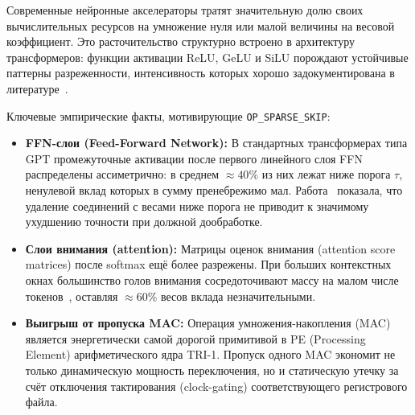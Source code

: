 
Современные нейронные акселераторы тратят значительную долю своих
вычислительных ресурсов на умножение нуля или малой величины на
весовой коэффициент.  Это расточительство структурно встроено
в архитектуру трансформеров: функции активации ReLU, GeLU и SiLU
порождают устойчивые паттерны разреженности, интенсивность которых
хорошо задокументирована в литературе~\cite{koren2024sparsity,
hoefler2021sparsity}.

Ключевые эмпирические факты, мотивирующие \texttt{OP\_SPARSE\_SKIP}:

\begin{itemize}
  \item \textbf{FFN-слои (Feed-Forward Network):}
        В стандартных трансформерах типа GPT промежуточные активации
        после первого линейного слоя FFN распределены ассиметрично:
        в среднем $\approx 40\%$ из них лежат ниже порога $\tau$,
        ненулевой вклад которых в сумму пренебрежимо мал.
        Работа~\cite{han2015deepcompression} показала, что удаление
        соединений с весами ниже порога не приводит к значимому
        ухудшению точности при должной дообработке.
  \item \textbf{Слои внимания (attention):}
        Матрицы оценок внимания (attention score matrices) после
        softmax ещё более разрежены.  При больших контекстных
        окнах большинство голов внимания сосредоточивают массу
        на малом числе токенов~\cite{parashar2017scnn},
        оставляя $\approx 60\%$ весов вклада незначительными.
  \item \textbf{Выигрыш от пропуска MAC:}
        Операция умножения-накопления (MAC) является
        энергетически самой дорогой примитивой в PE (Processing
        Element) арифметического ядра TRI-1.  Пропуск одного MAC
        экономит не только динамическую мощность переключения,
        но и статическую утечку за счёт отключения тактирования
        (clock-gating) соответствующего регистрового файла.
\end{itemize}

